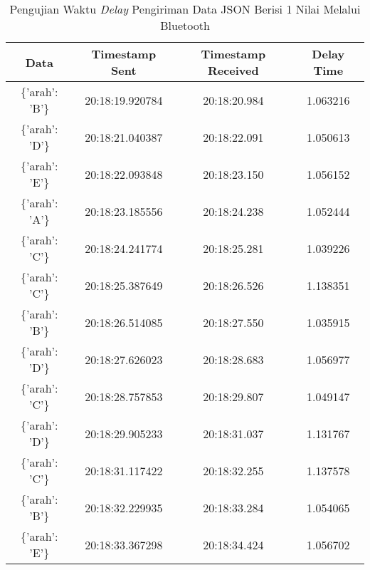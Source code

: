 \begin{longtable}{|ccc|c|}
  \caption{Pengujian Waktu \emph{Delay} Pengiriman Data JSON Berisi 1 Nilai Melalui Bluetooth}
  \label{tbl:delayBluetoothJSON1}\\
    \hline
    \multicolumn{1}{|c|}{Data}            & \multicolumn{1}{c|}{Timestamp Sent}  & Timestamp Received & Delay Time  \\ \hline
    \endfirsthead
    \endhead
    \multicolumn{1}{|c|}{\{'arah': 'B'\}} & \multicolumn{1}{c|}{20:18:19.920784} & 20:18:20.984       & 1.063216    \\ \hline
    \multicolumn{1}{|c|}{\{'arah': 'D'\}} & \multicolumn{1}{c|}{20:18:21.040387} & 20:18:22.091       & 1.050613    \\ \hline
    \multicolumn{1}{|c|}{\{'arah': 'E'\}} & \multicolumn{1}{c|}{20:18:22.093848} & 20:18:23.150       & 1.056152    \\ \hline
    \multicolumn{1}{|c|}{\{'arah': 'A'\}} & \multicolumn{1}{c|}{20:18:23.185556} & 20:18:24.238       & 1.052444    \\ \hline
    \multicolumn{1}{|c|}{\{'arah': 'C'\}} & \multicolumn{1}{c|}{20:18:24.241774} & 20:18:25.281       & 1.039226    \\ \hline
    \multicolumn{1}{|c|}{\{'arah': 'C'\}} & \multicolumn{1}{c|}{20:18:25.387649} & 20:18:26.526       & 1.138351    \\ \hline
    \multicolumn{1}{|c|}{\{'arah': 'B'\}} & \multicolumn{1}{c|}{20:18:26.514085} & 20:18:27.550       & 1.035915    \\ \hline
    \multicolumn{1}{|c|}{\{'arah': 'D'\}} & \multicolumn{1}{c|}{20:18:27.626023} & 20:18:28.683       & 1.056977    \\ \hline
    \multicolumn{1}{|c|}{\{'arah': 'C'\}} & \multicolumn{1}{c|}{20:18:28.757853} & 20:18:29.807       & 1.049147    \\ \hline
    \multicolumn{1}{|c|}{\{'arah': 'D'\}} & \multicolumn{1}{c|}{20:18:29.905233} & 20:18:31.037       & 1.131767    \\ \hline
    \multicolumn{1}{|c|}{\{'arah': 'C'\}} & \multicolumn{1}{c|}{20:18:31.117422} & 20:18:32.255       & 1.137578    \\ \hline
    \multicolumn{1}{|c|}{\{'arah': 'B'\}} & \multicolumn{1}{c|}{20:18:32.229935} & 20:18:33.284       & 1.054065    \\ \hline
    \multicolumn{1}{|c|}{\{'arah': 'E'\}} & \multicolumn{1}{c|}{20:18:33.367298} & 20:18:34.424       & 1.056702    \\ \hline

\end{longtable}
